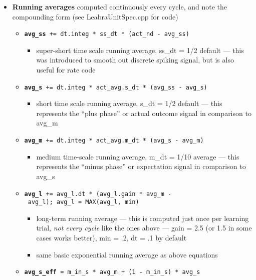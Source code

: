 \begin{itemize}
\tightlist
\item
  \textbf{Running averages} computed continuously every cycle, and note
  the compounding form (see LeabraUnitSpec.cpp for code)

  \begin{itemize}
  \tightlist
  \item
    \textbf{\texttt{avg\_ss}}\texttt{\ +=\ dt.integ\ *\ ss\_dt\ *\ (act\_nd\ -\ avg\_ss)}

    \begin{itemize}
    \tightlist
    \item
      super-short time scale running average, ss\_dt = 1/2 default ---
      this was introduced to smooth out discrete spiking signal, but is
      also useful for rate code
    \end{itemize}
  \item
    \textbf{\texttt{avg\_s}}\texttt{\ +=\ dt.integ\ *\ act\_avg.s\_dt\ *\ (avg\_ss\ -\ avg\_s)}

    \begin{itemize}
    \tightlist
    \item
      short time scale running average, s\_dt = 1/2 default --- this
      represents the ``plus phase'' or actual outcome signal in
      comparison to avg\_m
    \end{itemize}
  \item
    \textbf{\texttt{avg\_m}}\texttt{\ +=\ dt.integ\ *\ act\_avg.m\_dt\ *\ (avg\_s\ -\ avg\_m)}

    \begin{itemize}
    \tightlist
    \item
      medium time-scale running average, m\_dt = 1/10 average --- this
      represents the ``minus phase'' or expectation signal in comparison
      to avg\_s
    \end{itemize}
  \item
    \textbf{\texttt{avg\_l}}\texttt{\ +=\ avg\_l.dt\ *\ (avg\_l.gain\ *\ avg\_m\ -\ avg\_l);\ avg\_l\ =\ MAX(avg\_l,\ min)}

    \begin{itemize}
    \tightlist
    \item
      long-term running average --- this is computed just once per
      learning trial, \emph{not every cycle} like the ones above ---
      gain = 2.5 (or 1.5 in some cases works better), min = .2, dt = .1
      by default
    \item
      same basic exponential running average as above equations
    \end{itemize}
  \item
    \textbf{\texttt{avg\_s\_eff}}\texttt{\ =\ m\_in\_s\ *\ avg\_m\ +\ (1\ -\ m\_in\_s)\ *\ avg\_s}


\end{itemize}
\end{itemize}
